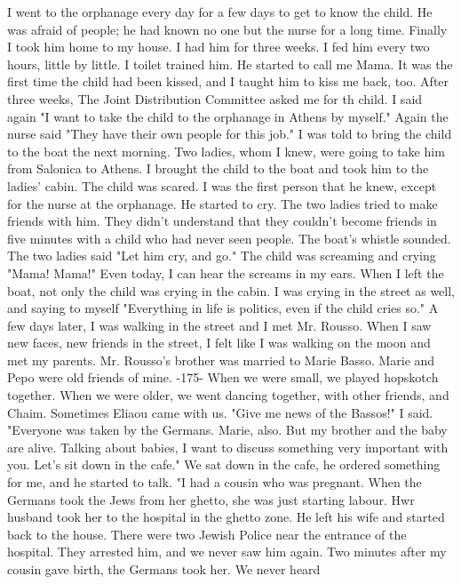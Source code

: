 I went to 
the orphanage every day for a few days to get to know the child.
He was 
afraid of people; he had known no one but the nurse for a long time.
Finally I took him home to my house.
I had him for three weeks.
I fed him every two hours, little by little.
I toilet trained him.
He started to
call me Mama.
It was the first time the child had been kissed, and I 
taught him to kiss me back, too.
After three weeks, The Joint Distribution Committee asked me for th 
child.
I said again "I want to take the child to the orphanage in Athens by
myself."
Again the nurse said "They have their own people for 
this job."
I was told to bring the child to the boat the next morning.
Two ladies, whom I knew, were going to take him from Salonica to Athens.
I brought the child to the boat and took him to the ladies' cabin.
The 
child was scared.
I was the first person that he knew, except for the 
nurse at the orphanage.
He started to cry.
The two ladies tried to make 
friends with him.
They didn't understand that they couldn't become 
friends in five minutes with a child who had never seen people.
The 
boat's whistle sounded.
The two ladies said "Let him cry, and go."
The 
child was screaming and crying "Mama!
Mama!"
Even today, I can hear the 
screams in my ears.
When I left the boat, not only the child was crying 
in the cabin.
I was crying in the street as well, and saying to myself 
"Everything in life is politics, even if the child cries so."
A few days later, I was walking in the street and I met Mr.
Rousso.
When I saw new faces, new friends in the street, I felt like I 
was walking on the moon and met my parents.
Mr.
Rousso's brother 
was married to Marie Basso.
Marie and Pepo were old friends of mine.
-175- 
When we were small, we played hopskotch together.
When we were older, 
we went dancing together, with other friends, and Chaim.
Sometimes 
Eliaou came with us.
"Give me news of the Bassos!"
I said.
"Everyone was taken by the Germans.
Marie, also.
But my brother 
and the baby are alive.
Talking about babies, I want to discuss something very important with you.
Let's sit down in the cafe."
We sat down in the cafe, he ordered something for me, and he started to 
talk.
"I had a cousin who was pregnant.
When the Germans took the 
Jews from her ghetto, she was just starting labour.
Hwr husband took 
her to the hospital in the ghetto zone.
He left his wife and started 
back to the house.
There were two Jewish Police near the entrance of 
the hospital.
They arrested him, and we never saw him again.
Two minutes after my cousin gave birth, the Germans took her.
We never heard 
